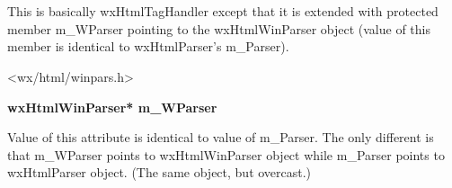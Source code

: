 %
%

\section{}\label{wxhtmlwintaghandler}

This is basically wxHtmlTagHandler except that
it is extended with protected member m\_WParser pointing to
the wxHtmlWinParser object (value of this member is identical
to wxHtmlParser's m\_Parser).




<wx/html/winpars.h>





\label{wxhtmlwintaghandlerwxhtmlwintaghandlermwparser}

{\bf wxHtmlWinParser* m\_WParser}

Value of this attribute is identical to value of m\_Parser. The only different
is that m\_WParser points to wxHtmlWinParser object while m\_Parser
points to wxHtmlParser object. (The same object, but overcast.)

